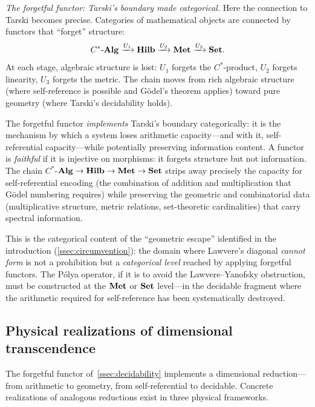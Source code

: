 \emph{The forgetful functor: Tarski's boundary made categorical.}
Here the connection to Tarski becomes precise.  Categories of
mathematical objects are connected by functors that ``forget''
structure:
\[
  C^*\text{-}\mathbf{Alg}
    \xrightarrow{U_1} \mathbf{Hilb} \xrightarrow{U_2} \mathbf{Met}
    \xrightarrow{U_3} \mathbf{Set}.
\]
At each stage, algebraic structure is lost: $U_1$ forgets the
$C^*$-product, $U_2$ forgets linearity, $U_3$ forgets the metric.
The chain moves from rich algebraic structure (where
self-reference is possible and G\"odel's theorem applies) toward
pure geometry (where Tarski's decidability holds).

The forgetful functor \emph{implements} Tarski's boundary
categorically: it is the mechanism by which a system loses arithmetic
capacity---and with it, self-referential capacity---while potentially
preserving information content.  A functor is \emph{faithful} if it
is injective on morphisms: it forgets structure but not information.
The chain $C^*$-$\mathbf{Alg} \to \mathbf{Hilb} \to \mathbf{Met} \to \mathbf{Set}$ strips
away precisely the capacity for self-referential encoding (the
combination of addition and multiplication that G\"odel numbering
requires) while preserving the geometric and combinatorial data
(multiplicative structure, metric relations, set-theoretic
cardinalities) that carry spectral information.

This is the categorical content of the ``geometric escape'' identified
in the introduction (\cref{ssec:circumvention}): the domain where Lawvere's diagonal
\emph{cannot form} is not a prohibition but a \emph{categorical level}
reached by applying forgetful functors.  The P\'olya operator, if it
is to avoid the Lawvere--Yanofsky obstruction, must be constructed
at the $\mathbf{Met}$ or $\mathbf{Set}$ level---in the decidable fragment where the
arithmetic required for self-reference has been systematically
destroyed.



\subsection{Physical realizations of dimensional
transcendence}\label{ssec:physical}

The forgetful functor of~\cref{ssec:decidability} implements a
dimensional reduction---from arithmetic to geometry, from
self-referential to decidable.  Concrete realizations of analogous
reductions exist in three physical frameworks.


